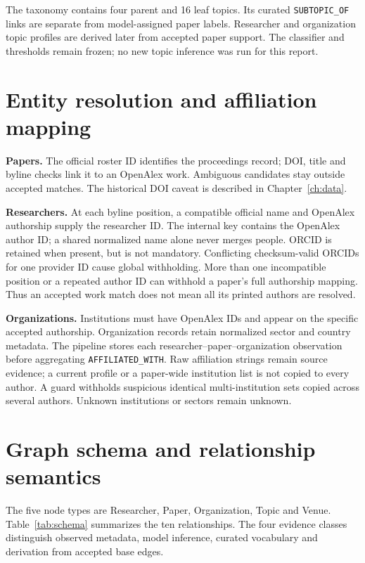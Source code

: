 The taxonomy contains four parent and 16 leaf topics. Its curated
\texttt{SUBTOPIC\_OF} links are separate from model-assigned paper labels.
Researcher and organization topic profiles are derived later from accepted
paper support. The classifier and thresholds remain frozen; no new topic
inference was run for this report.

\section{Entity resolution and affiliation mapping}
\textbf{Papers.} The official roster ID identifies the proceedings record;
DOI, title and byline checks link it to an OpenAlex work. Ambiguous candidates
stay outside accepted matches. The historical DOI caveat is described in
Chapter~\ref{ch:data}.

\textbf{Researchers.} At each byline position, a compatible official name and
OpenAlex authorship supply the researcher ID. The internal key contains the
OpenAlex author ID; a shared normalized name alone never merges people. ORCID is
retained when present, but is not mandatory. Conflicting checksum-valid ORCIDs
for one provider ID cause global withholding. More than one incompatible
position or a repeated author ID can withhold a paper's full authorship mapping.
Thus an accepted work match does not mean all its printed authors are resolved.

\textbf{Organizations.} Institutions must have OpenAlex IDs and appear on the
specific accepted authorship. Organization records retain normalized sector and
country metadata. The pipeline stores each researcher--paper--organization
observation before aggregating \texttt{AFFILIATED\_WITH}. Raw affiliation strings
remain source evidence; a current profile or a paper-wide institution list is
not copied to every author. A guard withholds suspicious identical multi-institution
sets copied across several authors. Unknown institutions or sectors remain unknown.

\section{Graph schema and relationship semantics}
The five node types are Researcher, Paper, Organization, Topic and Venue.
Table~\ref{tab:schema} summarizes the ten relationships. The four evidence
classes distinguish observed metadata, model inference, curated vocabulary and
derivation from accepted base edges.


\FloatBarrier

